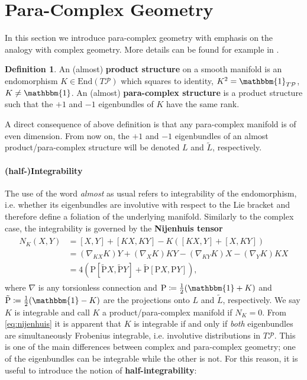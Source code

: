 \documentclass{article}
\newcommand{\PP}{\mathrm{P}}
\newcommand{\PPt}{\tilde{\mathrm{P}}}
\newcommand{\id}{\mathbbm{1}}
\newcommand{\PS}{\mathcal{P}}
\newcommand{\n}{\nabla}
\newcommand{\Lt}{\tl{L}}
\newcommand{\Endo}{\text{End}}
\def\tl{\tilde}
\theoremstyle{definition}
\newtheorem{Def}[theorem]{Definition}
\theoremstyle{definition}
\theoremstyle{remark}
\begin{document}
\section{Para-Complex Geometry}
In this section we introduce para-complex geometry with emphasis on the analogy with complex geometry. More details can be found for example in \cite[Ch.~15]{Cortes:2010ykx}.

\begin{Def}\label{def:paracpx}
An (almost) {\bf product structure} on a smooth manifold is an endomorphism $K\in \Endo(T\PS)$ which squares to identity, $K^2=\id_{T\PS}$, $K\neq \id$. An (almost) \textbf{para-complex structure} is a product structure such that the $+1$ and $-1$ eigenbundles of $K$ have the same rank.
\end{Def}
A direct consequence of above definition is that any para-complex manifold is of even dimension. From now on, the $+1$ and $-1$ eigenbundles of an almost product/para-complex structure will be denoted $L$ and $\Lt$, respectively.

\paragraph{(half-)Integrability} The use of the word {\it almost} as usual refers to integrability of the endomorphism, i.e. whether its eigenbundles are involutive with respect to the Lie bracket and therefore define a foliation of the underlying manifold. Similarly to the complex case, the integrability is governed by the \textbf{Nijenhuis tensor}
\begin{align}\label{eq:nijenhuis}
\begin{aligned}
N_K(X,Y)&=[X,Y]+[KX,KY]-K([KX,Y]+[X,KY])\\
&=(\n_{KX}K)Y+(\n_XK)KY-(\n_{KY}K)X-(\n_YK)KX\\
&=4(\PP[\PPt X,\PPt Y]+\PPt[\PP X,\PP Y]),
\end{aligned}
\end{align}
where $\n$ is any torsionless connection and $\PP\coloneqq\frac{1}{2}(\id+K)$ and $\PPt\coloneqq\frac{1}{2}(\id-K)$ are the projections onto $L$ and $\Lt$, respectively. We say $K$ is integrable and call $K$ a product/para-complex manifold if $N_K=0$. From \eqref{eq:nijenhuis} it is apparent that $K$ is integrable if and only if {\it both} eigenbundles are simultaneously Frobenius integrable, i.e. involutive distributions in $T\PS$. This is one of the main differences between complex and para-complex geometry; one of the eigenbundles can be integrable while the other is not. For this reason, it is useful to introduce the notion of {\bf half-integrability}:
\end{document}
